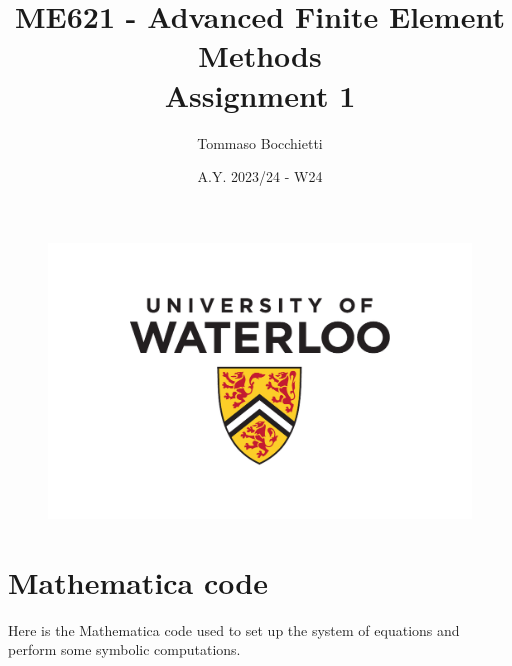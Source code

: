 \documentclass{assignment}
\begin{document}
\graphicspath{{./img/}}


\title{ME621 - Advanced Finite Element Methods \\ Assignment 1}
\author{Tommaso Bocchietti}
\date{A.Y. 2023/24 - W24}

\maketitle

\begin{figure}[H]
    \centering
    \includegraphics[width=.9\textwidth]{./pdf/UniversityOfWaterloo_logo_vert_pms}
    \label{fig:University_Of_Waterloo_logo}
\end{figure}

\clearpage
\tableofcontents
\listoffigures
\listoftables
\pagebreak







\appendix
\section{Mathematica code}
\label{sec:appendix}

Here is the Mathematica code used to set up the system of equations and perform some symbolic computations.


\end{document}
